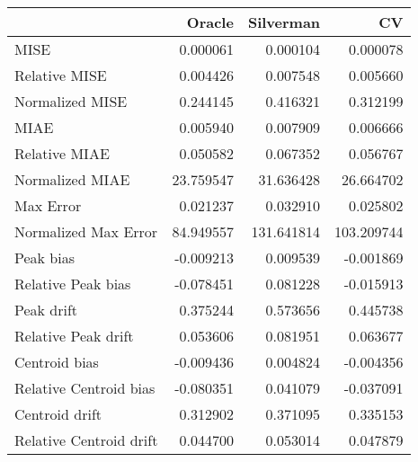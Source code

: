\begin{tabular}{lrrr}
  \hline
 & Oracle & Silverman & CV \\ 
  \hline
MISE & 0.000061 & 0.000104 & 0.000078 \\ 
  Relative MISE & 0.004426 & 0.007548 & 0.005660 \\ 
  Normalized MISE & 0.244145 & 0.416321 & 0.312199 \\ 
  MIAE & 0.005940 & 0.007909 & 0.006666 \\ 
  Relative MIAE & 0.050582 & 0.067352 & 0.056767 \\ 
  Normalized MIAE & 23.759547 & 31.636428 & 26.664702 \\ 
  Max Error & 0.021237 & 0.032910 & 0.025802 \\ 
  Normalized Max Error & 84.949557 & 131.641814 & 103.209744 \\ 
  Peak bias & -0.009213 & 0.009539 & -0.001869 \\ 
  Relative Peak bias & -0.078451 & 0.081228 & -0.015913 \\ 
  Peak drift & 0.375244 & 0.573656 & 0.445738 \\ 
  Relative Peak drift & 0.053606 & 0.081951 & 0.063677 \\ 
  Centroid bias & -0.009436 & 0.004824 & -0.004356 \\ 
  Relative Centroid bias & -0.080351 & 0.041079 & -0.037091 \\ 
  Centroid drift & 0.312902 & 0.371095 & 0.335153 \\ 
  Relative Centroid drift & 0.044700 & 0.053014 & 0.047879 \\ 
   \hline
\end{tabular}
